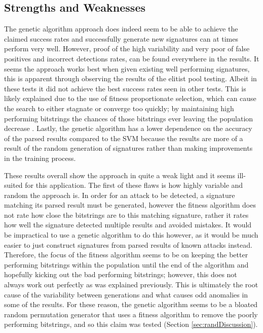 \subsection{Strengths and Weaknesses} \label{sec:genDisadvantages}

The genetic algorithm approach does indeed seem to be able to achieve the claimed success rates and successfully generate new signatures can at times perform very well.  However, proof of the high variability and very poor of false positives and incorrect detections rates, can be found everywhere in the results.  It seems the approach works best when given existing well performing signatures, this is apparent through observing the results of the elitist pool testing.  Albeit in these tests it did not achieve the best success rates seen in other tests.  This is likely explained due to the use of fitness proportionate selection, which can cause the search to either stagnate or converge too quickly; by maintaining high performing bitstrings the chances of those bitstrings ever leaving the population decrease \cite{selectionPressure}.  Lastly, the genetic algorithm has a lower dependence on the accuracy of the parsed results compared to the SVM because the results are more of a result of the random generation of signatures rather than making improvements in the training process.

These results overall show the approach in quite a weak light and it seems ill-suited for this application.  The first of these flaws is how highly variable and random the approach is.  In order for an attack to be detected, a signature matching its parsed result must be generated, however the fitness algorithm does not rate how close the bitstrings are to this matching signature, rather it rates how well the signature detected multiple results and avoided mistakes.  It would be impractical to use a genetic algorithm to do this however, as it would be much easier to just construct signatures from parsed results of known attacks instead.  Therefore, the focus of the fitness algorithm seems to be on keeping the better performing bitstrings within the population until the end of the algorithm and hopefully kicking out the bad performing bitstrings; however, this does not always work out perfectly as was explained previously.  This is ultimately the root cause of the variability between generations and what causes odd anomalies in some of the results.  For these reason, the genetic algorithm seems to be a bloated random permutation generator that uses a fitness algorithm to remove the poorly performing bitstrings, and so this claim was tested (Section \ref{sec:randDiscussion}).

